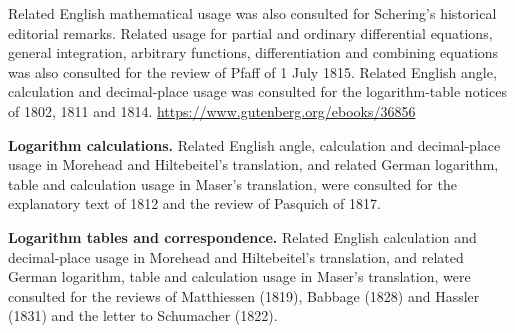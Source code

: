  Related English mathematical usage was also consulted for Schering’s historical editorial remarks. Related usage for partial and ordinary differential equations, general integration, arbitrary functions, differentiation and combining equations was also consulted for the review of Pfaff of 1 July 1815. Related English angle, calculation and decimal-place usage was consulted for the logarithm-table notices of 1802, 1811 and 1814.
\url{https://www.gutenberg.org/ebooks/36856}
\par\endgroup\clearpage\thispagestyle{empty}\begingroup\fontsize{9}{9.8}\selectfont\raggedright
{}\medskip

\par\medskip\textbf{Logarithm calculations.} Related English angle, calculation and decimal-place usage in Morehead and Hiltebeitel’s translation, and related German logarithm, table and calculation usage in Maser’s translation, were consulted for the explanatory text of 1812 and the review of Pasquich of 1817.

\par\medskip\textbf{Logarithm tables and correspondence.} Related English calculation and decimal-place usage in Morehead and Hiltebeitel’s translation, and related German logarithm, table and calculation usage in Maser’s translation, were consulted for the reviews of Matthiessen (1819), Babbage (1828) and Hassler (1831) and the letter to Schumacher (1822).

